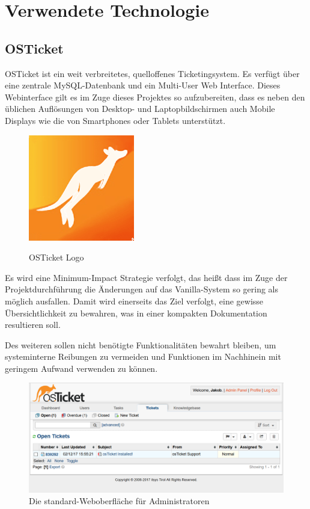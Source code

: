 	\section{Verwendete Technologie}
	\subsection{OSTicket}
	OSTicket ist ein weit verbreitetes, quelloffenes Ticketingsystem. Es verfügt über eine zentrale MySQL-Datenbank und ein Multi-User Web Interface. Dieses Webinterface gilt es im Zuge dieses Projektes so aufzubereiten, dass es neben den üblichen Auflösungen von Desktop- und Laptopbildschirmen auch Mobile Displays wie die von Smartphones oder Tablets unterstützt.
	\newpage
	
	\begin{figure}
		\vspace{-1cm}
		\begin{center}
		\caption{OSTicket Logo}
		\vspace{.5cm}
		\includegraphics[scale=.7]{figures/icon_osticket.png}
		
		\label{OSTicket Logo}
		\end{center}
	\end{figure}

	Es wird eine Minimum-Impact Strategie verfolgt, das heißt dass im Zuge der Projektdurchführung die Änderungen auf das Vanilla-System so gering als möglich ausfallen. Damit wird einerseits das Ziel verfolgt, eine gewisse Übersichtlichkeit zu bewahren, was in einer kompakten Dokumentation resultieren soll.
	
	Des weiteren sollen nicht benötigte Funktionalitäten bewahrt bleiben, um systeminterne Reibungen zu vermeiden und Funktionen im Nachhinein mit geringem Aufwand verwenden zu können.
	
	\begin{figure}[h]
		\centering
		\includegraphics[scale=0.62]{figures/osticket.png}
		\caption{Die standard-Weboberfläche für Administratoren}
		\label{OSTicket Admin WebGUI}
	\end{figure}

